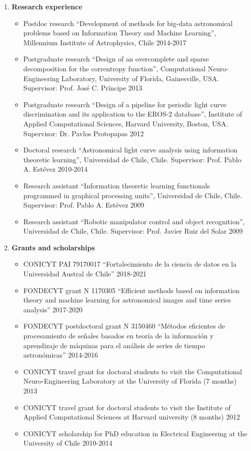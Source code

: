 \documentclass[letterpaper,11pt]{article}
\newcommand{\compactlist}{\setlength{\parskip}{0pt} \setlength{\leftskip}{2em}}
\begin{document}
\begin{enumerate}[I]
	\item \textbf{Research experience}
		\begin{itemize}  \compactlist
		\item Postdoc research ``Development of methods for big-data astronomical problems based on Information Theory and Machine Learning'', Millennium Institute of Astrophysics, Chile  \hfill2014-2017        \item Postgraduate research ``Design of an overcomplete and sparse decomposition for the correntropy function'', Computational Neuro-Engineering Laboratory, University of Florida, Gainesville, USA. Supervisor: Prof. Jos\'e C. Pr\'incipe   \hfill2013
        \item Postgraduate research ``Design of a pipeline for periodic light curve discrimination and its application to the EROS-2 database'', Institute of Applied Computational Sciences, Harvard University, Boston, USA. Supervisor: Dr. Pavlos Protopapas  \hfill2012
		\item Doctoral research ``Astronomical light curve analysis using information theoretic learning'', Universidad de Chile, Chile. Supervisor: Prof. Pablo A. Estévez \hfill2010-2014
		\item Research assistant ``Information theoretic learning functionals programmed in graphical processing units'', Universidad de Chile, Chile. Supervisor: Prof. Pablo A. Est\'evez \hfill2009
		\item Research assistant ``Robotic manipulator control and object recognition'', Universidad de Chile, Chile. Supervisor: Prof. Javier Ruiz del Solar \hfill2009
		\end{itemize}
		
	\item \textbf{Grants and scholarships}
		\begin{itemize}  \compactlist
		    \item CONICYT PAI 79170017 ``Fortalecimiento de la ciencia de datos en la Universidad Austral de Chile'' \hfill 2018-2021
		    \item FONDECYT grant N 1170305 ``Efficient methods based on information theory and machine learning for astronomical images and time series analysis'' \hfill2017-2020
			\item FONDECYT postdoctoral grant N 3150460 ``M\'etodos eficientes de procesamiento de señales basados en teoría de la información y aprendizaje de máquinas para el an\'alisis de series de tiempo astron\'omicas'' \hfill2014-2016
			\item CONICYT travel grant for doctoral students to visit the
			Computational Neuro-Engineering Laboratory at the University of Florida (7 months) \hfill2013
			\item CONICYT travel grant for doctoral students to visit the
			Institute of Applied Computational Sciences at Harvard university (8 months) \hfill2012
			\item CONICYT scholarship for PhD education in Electrical Engineering at the University
			of Chile \hfill2010-2014
		\end{itemize}
		

\end{enumerate}
\end{document}
